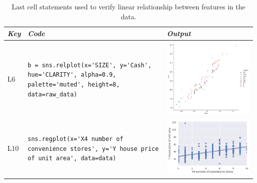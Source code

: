 \documentclass[smallextended]{svjour3}       %
\begin{document}
\begin{table}
  \centering
  \caption{Last cell statements used to verify linear relationship between features in the data.}
  \begin{tabular}{@{}m{} m{} m{}@{}}
    \toprule
    \emph{\textbf{Key}}&
    \emph{\textbf{Code}}&
    \emph{\textbf{Output}}\\
    \midrule

    L6&
    \lstinline[]$b = sns.relplot(x='SIZE', y='Cash', hue='CLARITY', alpha=0.9, palette='muted', height=8, data=raw_data)$&
    \includegraphics[width=\linewidth]{linear-relation-check-lineplot.png}\\

    L10&
    \lstinline[]$sns.regplot(x='X4 number of convenience stores', y='Y house price of unit area', data=data)$&
    \includegraphics[width=\linewidth]{linear-relation-check-regplot.png}\\
    \bottomrule
  \end{tabular}
\label{tab:linear-relation-check}
\end{table}
\end{document}
